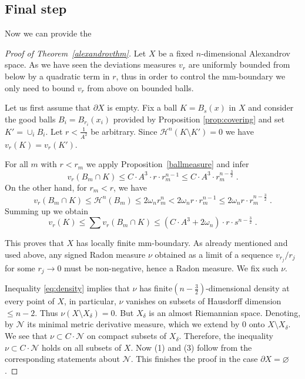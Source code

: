 \documentclass[12pt,leqno]{amsart}
\numberwithin{equation}{section}
\theoremstyle{definition}
\theoremstyle{remark}
\newcommand{\pref}[1]{Proposition~\ref{#1}}
\def\emptyset{\varnothing}
\begin{document}
\subsection{Final step}
Now we can provide the
\begin{proof}[Proof of Theorem~\ref{alexandrovthm}]
Let $X$ be a fixed $n$-dimensional Alexandrov space.  As we have seen the deviations measures $v_r$ are uniformly bounded from below
by a quadratic term in $r$, thus  in order to control the mm-boundary we only need to bound $v_r$ from above on bounded balls.

Let us first assume that $\partial X$  is empty.  Fix a ball $K=B_s (x)$ in  $X$ and consider the good  balls $B_i=B_{r_i} (x_i)$ provided by Proposition \ref{prop:covering} and set $K'=\cup _i B_i$. Let $r<\frac 1 {A^2}$ be arbitrary.  Since $\mathcal H^n (K\setminus K')=0$
we have $ v_r (K)=v_r (K')$.

For all $m$ with $r<r_m$ we apply \pref{ballmeasure} and infer
$$v_r(B_m \cap K)\le C\cdot A^3 \cdot r\cdot r_m^{n-1} \leq C\cdot A^3 \cdot r_{m} ^{n- \frac 32} \; .$$
On the other hand, for $r_m<r$, we have
$$v_r (B_m\cap K) \leq \mathcal H^n  (B_m) \leq 2 \omega _n r_m ^n < 2\omega_n r \cdot r_m ^{n-1} \leq 2\omega_n r \cdot r_m ^{n- \frac 32} \; .$$
Summing up we obtain
\begin{equation} \label{eq:density}
v_r (K) \leq \sum v_r (B_m \cap K) \leq (C\cdot A^3+2\omega _n) \cdot r \cdot s^{n- \frac 32} \; .
\end{equation}

This proves that $X$ has locally finite mm-boundary.  As already mentioned and used above, any  signed Radon measure $\nu$ obtained as a limit of a sequence $v_{r_j} /r_j$ for some $r_j\to 0$ must be non-negative, hence a Radon measure.    We fix such $\nu$.

Inequality \eqref{eq:density} implies that $\nu$ has finite$(n-\frac 32)$-dimensional density at every point of $X$, in particular, $\nu$  vanishes on subsets of Hausdorff dimension $\leq n-2$.  Thus $\nu (X \setminus X_{\delta } )=0$.
But $X_{\delta}$ is an almost Riemannian space. Denoting, by $\mathcal N $ its minimal metric derivative measure, which we extend by $0$ onto $X\setminus X_{\delta}$.
 We see that $\nu \subset C\cdot \mathcal N$ on compact subsets of $X_{\delta}$.  Therefore, the inequality
 $\nu \subset C\cdot \mathcal N$ holds on all subsets of $X$.
  Now (1) and (3) follow from the corresponding statements about $\mathcal N$.
 This finishes the proof in the case $\partial X=\emptyset$.




\end{proof}
\end{document}
